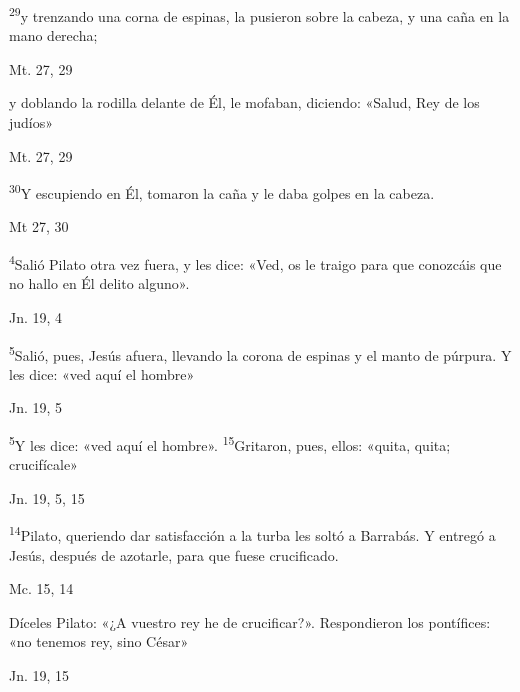 \documentclass[a4paper,11pt]{article}
\begin{document}
      \textsuperscript{29}y trenzando una corna de espinas, la pusieron sobre la cabeza, y una caña en la mano derecha; 
      \begin{flushright}
        Mt. 27, 29
      \end{flushright}

      y doblando la rodilla delante de Él, le mofaban, diciendo: «Salud, Rey de los judíos»
      \begin{flushright}
        Mt. 27, 29
      \end{flushright}

      \textsuperscript{30}Y escupiendo en Él, tomaron la caña y le daba golpes en la cabeza.
      \begin{flushright}
        Mt 27, 30
      \end{flushright}

      \textsuperscript{4}Salió Pilato otra vez fuera, y les dice: «Ved, os le traigo para que conozcáis que no hallo en Él delito alguno».
      \begin{flushright}
        Jn. 19, 4
      \end{flushright}

      \textsuperscript{5}Salió, pues, Jesús afuera, llevando la corona de espinas y el manto de púrpura. Y les dice: «ved aquí el hombre»
      \begin{flushright}
        Jn. 19, 5
      \end{flushright}

      \textsuperscript{5}Y les dice: «ved aquí el hombre». \textsuperscript{15}Gritaron, pues, ellos: «quita, quita; crucifícale»
      \begin{flushright}
        Jn. 19, 5, 15
      \end{flushright}

      \textsuperscript{14}Pilato, queriendo dar satisfacción a la turba les soltó a Barrabás. Y entregó a Jesús, después de azotarle, para que fuese crucificado.
      \begin{flushright}
        Mc. 15, 14
      \end{flushright}

      Díceles Pilato: «¿A vuestro rey he de crucificar?». Respondieron los pontífices: «no tenemos rey, sino César»
      \begin{flushright}
        Jn. 19, 15
      \end{flushright}
\end{document}
